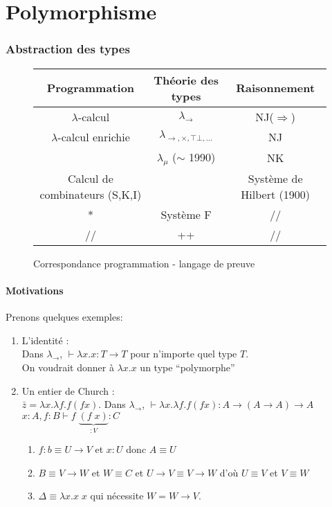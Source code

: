 \documentclass{article}
\newcommand\lterm[2]{\lambda #1. #2}
\newcommand\tlambda[0]{$\lambda$}
\begin{document}


\part{Polymorphisme}
\section{Abstraction des types}

\begin{figure}[h]
\begin{center}
\begin{tabular}{c | c | c}
Programmation & Théorie des types & Raisonnement\\
\hline
\tlambda-calcul & $\lambda_\to$ & NJ($\Rightarrow$) \\
\tlambda-calcul enrichie & $\lambda_{\to,\times,\top\bot,...}$ & NJ\\
 &  $\lambda_\mu$ ($\sim$ 1990) & NK\\
Calcul de combinateurs (S,K,I) &  & Système de Hilbert (1900)\\
\hline
* & Système F & // \\
\hline // & ++ & //\\
\end{tabular}
\caption{Correspondance programmation - langage de preuve}
\end{center}
\end{figure}


\subsection{Motivations}
Prenons quelques exemples:
\begin{enumerate}
\item L'identité :\\
Dans $\lambda_\to$, $\vdash \lterm{x}{x} : T \to T$ pour n'importe quel type $T$.\\
On voudrait donner à $\lterm{x}{x}$ un type ``polymorphe''
\item Un entier de Church :\\
$\bar{z} = \lterm{x}{\lterm{f}{f (f x)}}$. Dans $\lambda_\to$, $\vdash \lterm{x}{\lterm{f}{f (f x)}} : A \to (A \to A) \to A$\\
$x:A, f:B \vdash f\;\underbrace{(f\;x)}_{:V} : C$
\begin{enumerate}[noitemsep]
\item $f:b \equiv U \to V$ et $x : U$ donc $A \equiv U$
\item $B \equiv V \to W$ et $W \equiv C$ et $U \to V \equiv V \to W$ d'où $U \equiv V$ et $V\equiv W$
\item $\Delta \equiv \lterm{x}{x\;x}$ qui nécessite $W=W\to V$.
\end{enumerate}
\end{enumerate}
\end{document}
